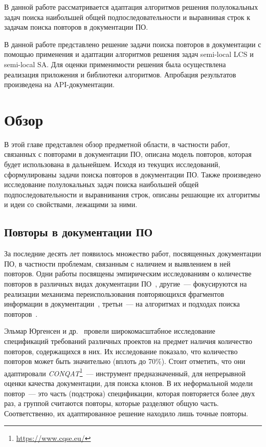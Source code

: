 В данной работе рассматривается адаптация алгоритмов решения полулокальных задач  поиска наибольшей общей подпоследовательности и выравнивая строк к задачам поиска повторов в документации ПО.



В данной работе представлено решение задачи поиска повторов в документации с помощью применения и адаптации алгоритмов решения задач {semi-local LCS} и {semi-local SA}. Для оценки применимости решения была осуществлена реализация приложения и библиотеки алгоритмов. Апробация результатов произведена на API-документации.



\section{Обзор}
В этой главе представлен обзор предметной области, в частности работ, связанных с повторами в документации ПО, описана модель повторов, которая будет использована в дальнейшем. 
Исходя из текущих исследований, сформулированы задачи поиска повторов в документации ПО.
Также произведено исследование полулокальных задач поиска наибольшей общей подпоследовательности и выравнивания строк, описаны решающие их алгоритмы и идеи со свойствами, лежащими за ними.

\subsection{Повторы в документации ПО}\label{duplicateReport}

За последние десять лет появилось множество работ, посвященных документации ПО, в частности проблемам, связанным с наличием и выявлением в ней повторов.
Одни работы посвящены эмпирическим исследованиям о количестве повторов  в различных видах документации ПО~\cite{poruban2016preliminary,juergens2010can,oumaziz2017documentation}, другие~--- фокусируются на реализации механизма переиспользования повторяющихся фрагментов информации в документации~\cite{koznov2015clone,horie2010tool,poruban2014reusable}, третьи~--- на алгоритмах и подходах поиска повторов~\cite{luciv2018detecting,luciv2019interactive,blasi2018replicomment,rago2016identifying, soto2015similarity}.

Эльмар Юргенсен и др.~\cite{juergens2010can} провели широкомасштабное исследование спецификаций требований различных проектов на предмет наличия количество повторов, содержащихся в них. 
Их исследование показало, что количество повторов может быть значительно (вплоть до 70\%). 
Стоит отметить, что они адаптировали \emph{CONQAT}\footnote{\url{https://www.cqse.eu/}}~--- инструмент предназначенный, для непрерывной оценки качества документации, для поиска клонов.
В их неформальной модели повтор~--- это часть (подстрока) спецификации, которая повторяется более двух раз, а группой считаются повторы, которые разделяют общую часть. 
Соответственно, их адаптированное решение находило лишь точные повторы.

